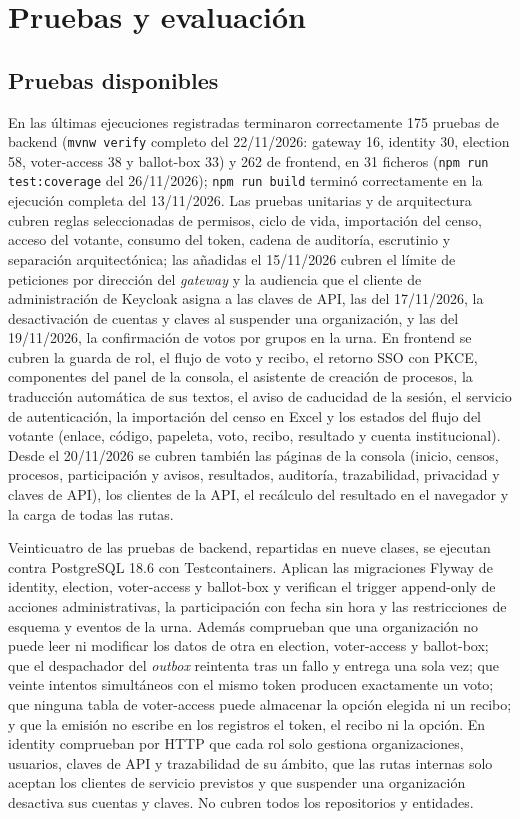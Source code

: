 \chapter{Pruebas y evaluación}
\label{cap:evaluacion-resultados}

\section{Pruebas disponibles}
En las últimas ejecuciones registradas terminaron correctamente 175 pruebas
de backend (\texttt{mvnw verify} completo del 22/11/2026: gateway 16,
identity 30, election 58, voter-access 38 y ballot-box 33) y 262 de frontend,
en 31 ficheros (\texttt{npm run test:coverage} del 26/11/2026); \texttt{npm run build} terminó
correctamente en la ejecución completa del 13/11/2026. Las pruebas unitarias y de arquitectura cubren reglas
seleccionadas de permisos, ciclo de vida, importación del censo, acceso del
votante, consumo del token, cadena de auditoría, escrutinio y separación
arquitectónica; las añadidas el 15/11/2026 cubren el límite de peticiones por
dirección del \emph{gateway} y la audiencia que el cliente de administración de
Keycloak asigna a las claves de API, las del 17/11/2026, la desactivación
de cuentas y claves al suspender una organización, y las del 19/11/2026, la
confirmación de votos por grupos en la urna. En frontend se cubren la guarda de rol, el flujo de voto y
recibo, el retorno SSO con PKCE, componentes del panel de la consola, el
asistente de creación de procesos, la traducción automática de sus textos, el
aviso de caducidad de la sesión, el servicio de autenticación, la importación
del censo en Excel y los estados del flujo del votante (enlace, código,
papeleta, voto, recibo, resultado y cuenta institucional). Desde el
20/11/2026 se cubren también las páginas de la consola (inicio, censos,
procesos, participación y avisos, resultados, auditoría, trazabilidad,
privacidad y claves de API), los clientes de la API, el recálculo del
resultado en el navegador y la carga de todas las rutas.

Veinticuatro de las pruebas de backend, repartidas en nueve clases, se ejecutan
contra PostgreSQL 18.6 con Testcontainers. Aplican las migraciones Flyway de
identity, election, voter-access y ballot-box y verifican el trigger
append-only de acciones administrativas, la participación con fecha sin hora
y las restricciones de esquema y eventos de la urna. Además comprueban que una
organización no puede leer ni modificar los datos de otra en election,
voter-access y ballot-box; que el despachador del \emph{outbox} reintenta
tras un fallo y entrega una sola vez; que veinte intentos simultáneos con el
mismo token producen exactamente un voto; que ninguna tabla de voter-access
puede almacenar la opción elegida ni un recibo; y que la emisión no escribe
en los registros el token, el recibo ni la opción. En identity comprueban por
HTTP que cada rol solo gestiona organizaciones, usuarios, claves de API y
trazabilidad de su ámbito, que las rutas internas solo aceptan los clientes de
servicio previstos y que suspender una organización desactiva sus cuentas y
claves. No cubren todos los repositorios y entidades.

